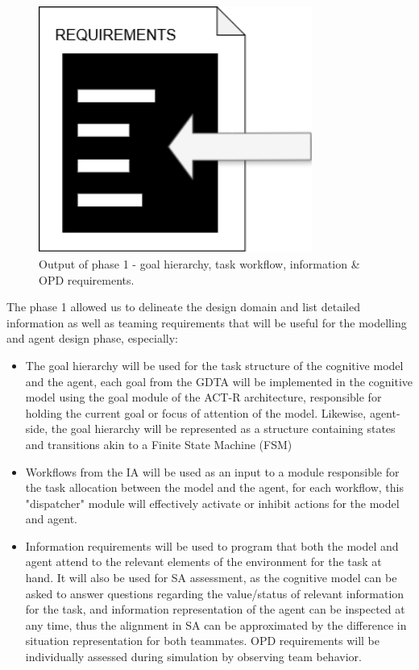 \documentclass[12pt,a4paper]{article} %
\begin{document}
\begin{figure}[H]
\begin{minipage}[b]{0.3\textwidth}
			\includegraphics[width=0.8\textwidth]{images/requirements.png}
		\end{minipage}
		\caption{Output of phase 1 - goal hierarchy, task workflow, information \& OPD requirements.}
		\label{fig:logos}
	\end{figure}

	The phase 1 allowed us to delineate the design domain and list detailed information as well as teaming requirements that will be useful for the modelling and agent design phase, especially:

	\begin{itemize}
		\item The goal hierarchy will be used for the task structure of the cognitive model and the agent, each goal from the GDTA will be implemented in the cognitive model using the goal module of the ACT-R architecture, responsible for holding the current goal or focus of attention of the model. Likewise, agent-side, the goal hierarchy will be represented as a structure containing states and transitions akin to a Finite State Machine (FSM)
		\item Workflows from the IA will be used as an input to a module responsible for the task allocation between the model and the agent, for each workflow, this "dispatcher" module will effectively activate or inhibit actions for the model and agent.
		\item Information requirements will be used to program that both the model and agent attend to the relevant elements of the environment for the task at hand. It will also be used for SA assessment, as the cognitive model can be asked to answer questions regarding the value/status of relevant information for the task, and information representation of the agent can be inspected at any time, thus the alignment in SA can be approximated by the difference in situation representation for both teammates. OPD requirements will be individually assessed during simulation by observing team behavior.
	\end{itemize}
\end{document}
